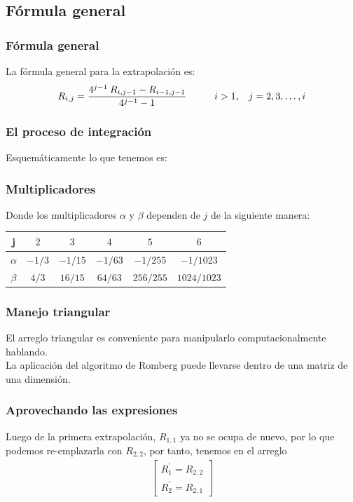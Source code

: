 \subsection*{Fórmula general}
\begin{frame}
\frametitle{Fórmula general}
La fórmula general para la extrapolación es:
\begin{align*}
R_{i, j} = \dfrac{4^{j - 1} \: R_{i, j - 1} - R_{i - 1, j - 1} }{4^{j - 1} - 1} \hspace{1cm} i > 1, \hspace{0.3cm} j = 2, 3, \ldots, i
\end{align*}
\end{frame}
\begin{frame}[fragile]
\frametitle{El proceso de integración}
Esquemáticamente lo que tenemos es:
\begin{figure}
  \centering
  
\end{figure}
\end{frame}
\begin{frame}
\frametitle{Multiplicadores}
Donde los multiplicadores $\alpha$ y $\beta$ dependen de $j$ de la siguiente manera:
\fontsize{12}{12}\selectfont
\begin{center}
\begin{tabular}{c | c | c | c | c | c}
\hline
j & $2$ & $3$ & $4$ & $5$ & $6$ \\ \hline
$\alpha$ & $-1/3$ & $-1/15$ & $-1/63$ & $-1/255$ & $-1/1023$ \\ \hline
$\beta$ & $4/3$ & $16/15$ & $64/63$ & $256/255$ & $1024/1023$ \\ \hline
\end{tabular}
\end{center}
\end{frame}
\begin{frame}
\frametitle{Manejo triangular}
El arreglo triangular es conveniente para manipularlo computacionalmente hablando.
\\
\bigskip
La aplicación del algoritmo de Romberg puede llevarse dentro de una matriz de una dimensión.
\end{frame}
\begin{frame}
\frametitle{Aprovechando las expresiones}
Luego de la primera extrapolación, $R_{1,1}$ ya no se ocupa de nuevo, por lo que podemos re-emplazarla con $R_{2,2}$, por tanto, tenemos en el arreglo
\begin{align*}
\begin{bmatrix}
R^{\prime}_{1} = R_{2, 2} \\
R^{\prime}_{2} = R_{2, 1}
\end{bmatrix}
\end{align*}
\end{frame}
